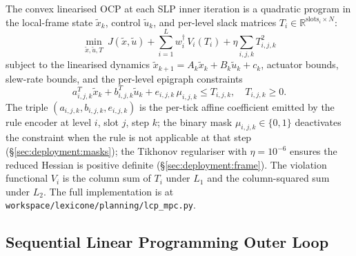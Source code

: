 The convex linearised OCP at each SLP inner iteration is a quadratic program in the local-frame state $\tilde{x}_{k}$, control $\tilde{u}_{k}$, and per-level slack matrices $T_i \in \mathbb{R}^{\mathrm{slots}_i \times N}$:
\begin{equation}
    \min_{\tilde{x}, \tilde{u}, T}\ J(\tilde{x}, \tilde{u}) + \sum_{i=1}^{L} w_i^{\dagger}\, V_i(T_i) + \eta \sum_{i,j,k} T_{i,j,k}^{2}
    \label{eq:lcp-ocp}
\end{equation}
subject to the linearised dynamics $\tilde{x}_{k+1} = A_k \tilde{x}_k + B_k \tilde{u}_k + c_k$, actuator bounds, slew-rate bounds, and the per-level epigraph constraints
\begin{equation}
    a_{i,j,k}^{T} \tilde{x}_k + b_{i,j,k}^{T} \tilde{u}_k + e_{i,j,k}\, \mu_{i,j,k} \leq T_{i,j,k}, \quad T_{i,j,k} \geq 0.
    \label{eq:lcp-epigraph}
\end{equation}
The triple $(a_{i,j,k}, b_{i,j,k}, e_{i,j,k})$ is the per-tick affine coefficient emitted by the rule encoder at level $i$, slot $j$, step $k$; the binary mask $\mu_{i,j,k} \in \{0, 1\}$ deactivates the constraint when the rule is not applicable at that step (\S\ref{sec:deployment:masks}); the Tikhonov regulariser with $\eta = 10^{-6}$ ensures the reduced Hessian is positive definite (\S\ref{sec:deployment:frame}). The violation functional $V_i$ is the column sum of $T_i$ under $L_1$ and the column-squared sum under $L_2$. The full implementation is at \texttt{workspace/lexicone/planning/lcp\_mpc.py}.

\subsection{Sequential Linear Programming Outer Loop}
\label{sec:deployment:slp}

